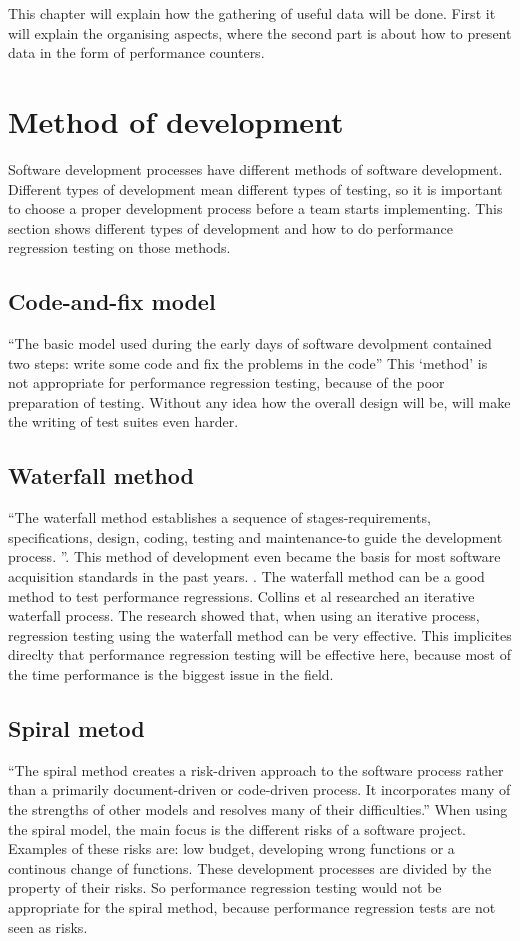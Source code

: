 This chapter will explain how the gathering of useful data will be done. First it will explain the organising aspects, where the second part is about how to present data in the form of performance counters.
\section{Method of development}
Software development processes have different methods of software development. Different types of development mean different types of testing, so it is important to choose a proper development process before a team starts implementing. This section shows different types of development and how to do performance regression testing on those methods.
\subsection{Code-and-fix model}
``The basic model used during the early days of software devolpment contained two steps: write some code and fix the problems in the code'' \cite{boehm1988spiral} This `method' is not appropriate for performance regression testing, because of the poor preparation of testing. Without any idea how the overall design will be, will make the writing of test suites even harder.

\subsection{Waterfall method}
``The waterfall method establishes a sequence of stages-requirements, specifications, design, coding, testing and maintenance-to guide the development process. ''\cite{kang1989software}. This method of development even became the basis for most software acquisition standards in the past years. \cite{boehm1988spiral}. The waterfall method can be a good method to test performance regressions. Collins et al researched an iterative waterfall process. \cite{collins2010iterative} The research showed that, when using an iterative process, regression testing using the waterfall method can be very effective. This implicites direclty that performance regression testing will be effective here, because most of the time performance is the biggest issue in the field. \cite{foo2010mining}
\subsection{Spiral metod}
``The spiral method creates a risk-driven approach to the software process rather than a primarily document-driven or code-driven process. It incorporates many of the strengths
of other models and resolves many of their
difficulties.''\cite{boehm1988spiral} When using the spiral model, the main focus is the different risks of a software project. Examples of these risks are: low budget, developing wrong functions or a continous change of functions. These development processes are divided by the property of their risks. So performance regression testing would not be appropriate for the spiral method, because performance regression tests are not seen as risks.  
